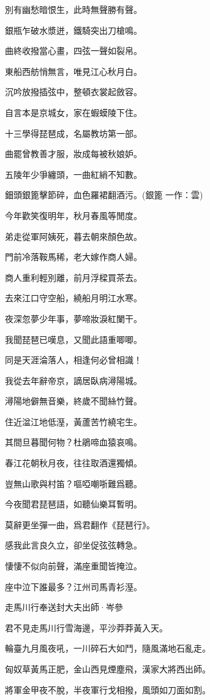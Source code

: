 \documentclass[12pt,a4paper]{ctexbook}
\begin{document}
別有幽愁暗恨生，此時無聲勝有聲。\par
銀瓶乍破水漿迸，鐵騎突出刀槍鳴。\par
曲終收撥當心畫，四弦一聲如裂帛。\par
東船西舫悄無言，唯見江心秋月白。\par
沉吟放撥插弦中，整頓衣裳起斂容。\par
自言本是京城女，家在蝦蟆陵下住。\par
十三學得琵琶成，名屬教坊第一部。\par
曲罷曾教善才服，妝成每被秋娘妒。\par
五陵年少爭纏頭，一曲紅綃不知數。\par
鈿頭銀篦擊節碎，血色羅裙翻酒污。(銀篦 一作：雲)\par
今年歡笑復明年，秋月春風等閒度。\par
弟走從軍阿姨死，暮去朝來顏色故。\par
門前冷落鞍馬稀，老大嫁作商人婦。\par
商人重利輕別離，前月浮樑買茶去。\par
去來江口守空船，繞船月明江水寒。\par
夜深忽夢少年事，夢啼妝淚紅闌干。\par
我聞琵琶已嘆息，又聞此語重唧唧。\par
同是天涯淪落人，相逢何必曾相識！\par
我從去年辭帝京，謫居臥病潯陽城。\par
潯陽地僻無音樂，終歲不聞絲竹聲。\par
住近湓江地低溼，黃蘆苦竹繞宅生。\par
其間旦暮聞何物？杜鵑啼血猿哀鳴。\par
春江花朝秋月夜，往往取酒還獨傾。\par
豈無山歌與村笛？嘔啞嘲哳難爲聽。\par
今夜聞君琵琶語，如聽仙樂耳暫明。\par
莫辭更坐彈一曲，爲君翻作《琵琶行》。\par
感我此言良久立，卻坐促弦弦轉急。\par
悽悽不似向前聲，滿座重聞皆掩泣。\par
座中泣下誰最多？江州司馬青衫溼。\par
走馬川行奉送封大夫出師·岑參\par
君不見走馬川行雪海邊，平沙莽莽黃入天。\par
輪臺九月風夜吼，一川碎石大如鬥，隨風滿地石亂走。\par
匈奴草黃馬正肥，金山西見煙塵飛，漢家大將西出師。\par
將軍金甲夜不脫，半夜軍行戈相撥，風頭如刀面如割。\par
\end{document}
